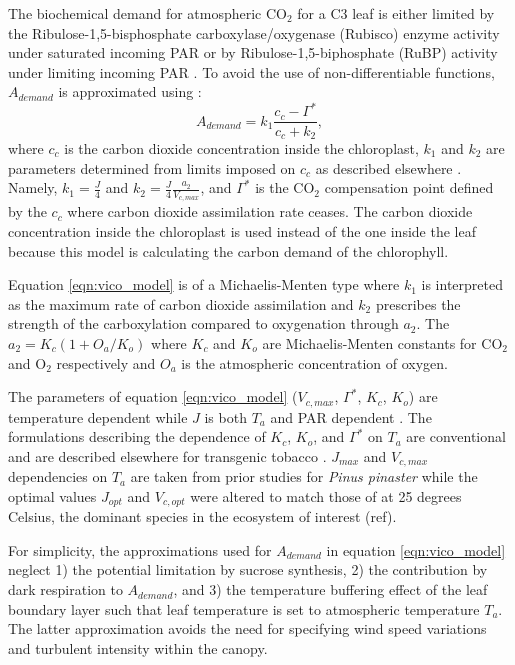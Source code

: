 \documentclass[utf8]{frontiersSCNS} %
\begin{document}
The biochemical demand for atmospheric CO$_2$ for a C3 leaf is either limited by the Ribulose-1,5-bisphosphate carboxylase/oxygenase (Rubisco) enzyme activity under saturated incoming PAR or by Ribulose-1,5-biphosphate (RuBP) activity under limiting incoming PAR \citep{farquhar_biochemical_1980}. To avoid the use of non-differentiable functions, $A_{demand}$ is approximated using \citep{vico_perspective_2013}:
\begin{equation}
    \label{eqn:vico_model}
    A_{demand} = k_1 \frac{c_c - \Gamma^*}{c_c + k_2},
\end{equation}
where $c_c$ is the carbon dioxide concentration inside the chloroplast, $k_1$ and $k_2$ are parameters determined from limits imposed on $c_c$ as described elsewhere \citep{vico_perspective_2013}. Namely, $k_1 = \frac{J}{4}$ and $k_2 = \frac{J}{4} \frac{a_2}{V_{c,max}}$, and $\Gamma^*$ is the CO$_2$ compensation point defined by the $c_c$ where carbon dioxide assimilation rate ceases. The carbon dioxide concentration inside the chloroplast is used instead of the one inside the leaf because this model is calculating the carbon demand of the chlorophyll.

Equation \ref{eqn:vico_model} is of a Michaelis-Menten type where $k_1$ is interpreted as the maximum rate of carbon dioxide assimilation and $k_2$ prescribes the strength of the carboxylation compared to oxygenation through $a_2$. The $a_2 = K_c (1+O_a/K_o)$ where $K_c$ and $K_o$ are Michaelis-Menten constants for CO$_2$ and O$_2$ respectively and $O_a$ is the atmospheric concentration of oxygen.

The parameters of equation \ref{eqn:vico_model} ($V_{c,max}$, $\Gamma^*$, $K_c$, $K_o$) are temperature dependent while $J$ is both $T_a$ and PAR dependent \citep{medlyn_temperature_2002}. The formulations describing the dependence of $K_c$, $K_o$, and $\Gamma^*$ on $T_a$ are conventional and are described elsewhere for transgenic tobacco \citep{bernacchi_improved_2001}. $J_{max}$ and $V_{c,max}$ dependencies on $T_a$ are taken from prior studies for \textit{Pinus pinaster} \citep{medlyn_temperature_2002} while the optimal values $J_{opt}$ and $V_{c,opt}$ were altered to match those of  at 25 degrees Celsius, the dominant species in the ecosystem of interest (ref).

For simplicity, the approximations used for $A_{demand}$ in equation \ref{eqn:vico_model} neglect 1) the potential limitation by sucrose synthesis, 2) the contribution by dark respiration to $A_{demand}$, and 3) the temperature buffering effect of the leaf boundary layer such that leaf temperature is set to atmospheric temperature $T_a$.  The latter approximation avoids the need for specifying wind speed variations and turbulent intensity within the canopy.
\end{document}
